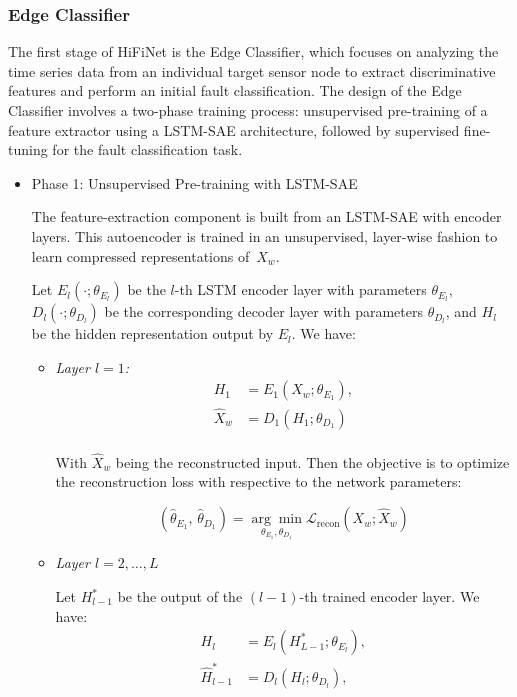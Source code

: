 \subsubsection{Edge Classifier}
The first stage of HiFiNet is the Edge Classifier, which focuses on analyzing the time series data from an individual target sensor node to extract discriminative features and perform an initial fault classification. The design of the Edge Classifier involves a two-phase training process: unsupervised pre-training of a feature extractor using a LSTM-SAE architecture, followed by supervised fine-tuning for the fault classification task.
\begin{itemize}
  \item Phase 1: Unsupervised Pre-training with LSTM-SAE 

  The feature-extraction component is built from an LSTM-SAE with encoder layers. This autoencoder is trained in an unsupervised, layer-wise fashion to learn compressed representations of~\(X_w\).

  Let \(E_l(\cdot; \theta_{E_l})\) be the \(l\)-th LSTM encoder layer with parameters \(\theta_{E_l}\), \(D_l(\cdot; \theta_{D_l})\) be the corresponding decoder layer with parameters \(\theta_{D_l}\), and \(H_l\) be the hidden representation output by \(E_l\). We have:

  \begin{itemize}
    \item \emph{Layer \(l=1\):}
      \[
        \begin{aligned}
          H_1 &= E_1(X_w; \theta_{E_1}), \\
          \hat X_w &= D_1(H_1; \theta_{D_1}) \\
        \end{aligned}
      \]
      
      With \(\hat X_w\) being the reconstructed input. Then the objective is to optimize the reconstruction loss with respective to the network parameters:

      \[(\hat \theta_{E_1},\,\hat \theta_{D_1}) = \underset{\theta_{E_1}, \theta_{D_1}} {\arg\min} \mathcal L_{\text{recon}}(X_w; \hat X_w)\]
    \item \emph{Layer \(l = 2, \ldots, L\)}

      Let \(H^*_{l-1}\) be the output of the \((l-1)\)-th trained encoder layer. We have:
      \[
        \begin{aligned}
          H_l &= E_l(H^*_{L-1}; \theta_{E_l}), \\ 
          \hat H^*_{l-1} &= D_l(H_l; \theta_{D_l}), \\
        \end{aligned}
      \]


\end{itemize}
\end{itemize}
